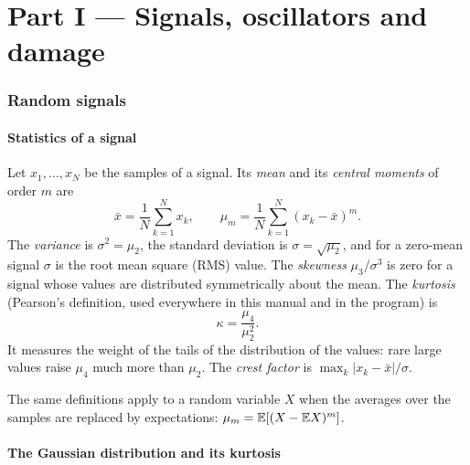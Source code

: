 \part*{Part I --- Signals, oscillators and damage}

\section{Random signals}\label{sec:signals}

\subsection{Statistics of a signal}

Let $x_1,\dots,x_N$ be the samples of a signal. Its \emph{mean} and its \emph{central moments} of
order $m$ are
\begin{equation}
  \bar x = \frac1N\sum_{k=1}^N x_k, \qquad \mu_m = \frac1N\sum_{k=1}^N (x_k-\bar x)^m .
\end{equation}
The \emph{variance} is $\sigma^2 = \mu_2$, the standard deviation is $\sigma=\sqrt{\mu_2}$, and for a
zero-mean signal $\sigma$ is the root mean square (RMS) value. The \emph{skewness} $\mu_3/\sigma^3$ is
zero for a signal whose values are distributed symmetrically about the mean. The \emph{kurtosis}
(Pearson's definition, used everywhere in this manual and in the program) is
\begin{equation}\label{eq:kurtosis}
  \kappa = \frac{\mu_4}{\mu_2^{2}} .
\end{equation}
It measures the weight of the tails of the distribution of the values: rare large values raise
$\mu_4$ much more than $\mu_2$. The \emph{crest factor} is $\max_k|x_k-\bar x|/\sigma$.

The same definitions apply to a random variable $X$ when the averages over the samples are replaced
by expectations: $\mu_m = \mathbb{E}[(X-\mathbb{E} X)^m]$.

\subsection{The Gaussian distribution and its kurtosis}\label{sec:gausskurt}

